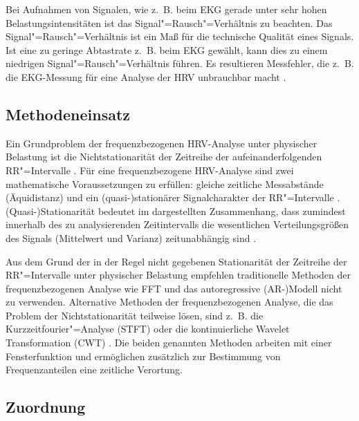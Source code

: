 Bei Aufnahmen von Signalen, wie z.~B. beim \ac{EKG} gerade unter sehr hohen Belastungsintensitäten ist das Signal"=Rausch"=Verhältnis zu beachten. Das Signal"=Rausch"=Verhältnis ist ein Maß für die technische Qualität eines Signals. Ist eine zu geringe Abtastrate z.~B. beim \ac{EKG} gewählt, kann dies zu einem niedrigen Signal"=Rausch"=Verhältnis führen. Es resultieren Messfehler, die z.~B. die \ac{EKG}-Messung für eine Analyse der \ac{HRV} unbrauchbar macht \citep{Hoos2010}.

\subsection{Methodeneinsatz} 

\label{sub:methodeneinsatz}

Ein Grundproblem der frequenzbezogenen \ac{HRV}-Analyse unter physischer Belastung ist die Nichtstationarität der Zeitreihe der aufeinanderfolgenden RR"=Intervalle \citep{Hottenrott2006}. Für eine frequenzbezogene \ac{HRV}-Analyse sind zwei mathematische Voraussetzungen zu erfüllen: gleiche zeitliche Messabstände (Äquidistanz) und ein (quasi-)stationärer Signalcharakter der RR"=Intervalle \citep{Hoos2006}. (Quasi-)Stationarität bedeutet im dargestellten Zusammenhang, dass zumindest innerhalb des zu analysierenden Zeitintervalls die wesentlichen Verteilungsgrößen des Signals (Mittelwert und Varianz) zeitunabhängig sind \citep{Hoos2006}.

Aus dem Grund der in der Regel nicht gegebenen Stationarität der Zeitreihe der RR"=Intervalle unter physischer Belastung empfehlen \citet[S.~113]{Sarmiento2013} traditionelle Methoden der frequenzbezogenen Analyse wie \acs{FFT} und das autoregressive (AR-)Modell nicht zu verwenden. Alternative Methoden der frequenzbezogenen Analyse, die das Problem der Nichtstationarität teilweise lösen, sind z.~B. die Kurzzeitfourier"=Analyse (STFT) oder die kontinuierliche Wavelet Transformation (CWT) \citep[][S.~61f.]{Hoos2010}. Die beiden genannten Methoden arbeiten mit einer Fensterfunktion und ermöglichen zusätzlich zur Bestimmung von Frequenzanteilen eine zeitliche Verortung. 

\subsection{Zuordnung} 

\label{sub:zuordnung}


